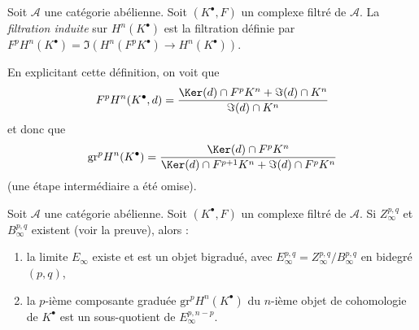 \begin{definition}
\label{definition-filtration-cohomology-filtered-complex}
Soit $\mathcal{A}$ une catégorie abélienne.
Soit $(K^\bullet, F)$ un complexe filtré de $\mathcal{A}$.
La {\it filtration induite} sur $H^n(K^\bullet)$ est la filtration définie
par $F^pH^n(K^\bullet) = \Im(H^n(F^pK^\bullet) \to H^n(K^\bullet))$.
\end{definition}

\noindent
En explicitant cette définition, on voit que
\begin{equation}
\label{equation-filtration-cohomology}
F^pH^n(K^\bullet, d) =
\frac{\Ker(d) \cap F^pK^n + \Im(d) \cap K^n}{\Im(d) \cap K^n}
\end{equation}
et donc que
\begin{equation}
\label{equation-graded-cohomology}
\text{gr}^p H^n(K^\bullet) =
\frac{\Ker(d) \cap F^pK^n}{\Ker(d) \cap F^{p + 1}K^n + \Im(d) \cap F^pK^n}
\end{equation}
(une étape intermédiaire a été omise).

\begin{lemma}
\label{lemma-compute-cohomology-filtered-complex}
Soit $\mathcal{A}$ une catégorie abélienne. Soit $(K^\bullet, F)$ un complexe
filtré de $\mathcal{A}$. Si $Z_\infty^{p, q}$ et $B_\infty^{p, q}$ existent
(voir la preuve), alors :
\begin{enumerate}
\item la limite $E_\infty$ existe et est un objet bigradué, avec
$E_\infty^{p, q} = Z_\infty^{p, q}/B_\infty^{p, q}$ en bidegré $(p, q)$,
\item la $p$-ième composante graduée $\text{gr}^pH^n(K^\bullet)$ du
$n$-ième objet de cohomologie de $K^\bullet$ est un sous-quotient de
$E_\infty^{p, n - p}$.
\end{enumerate}
\end{lemma}

